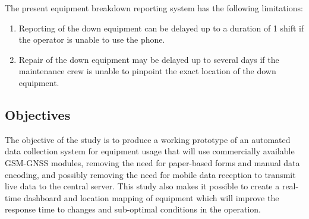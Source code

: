 \documentclass{article}
\begin{document}
The present equipment breakdown reporting system has the following limitations:

\begin{enumerate}
    \item Reporting of the down equipment can be delayed up to a duration of 1 shift if the operator is unable to use the phone.
    \item Repair of the down equipment may be delayed up to several days if the maintenance crew is unable to pinpoint the exact location of the down equipment.
\end{enumerate}


\subsection{Objectives}

The objective of the study is to produce a working prototype of an automated data collection system for equipment usage that will use commercially available GSM-GNSS modules, removing the need for paper-based forms and manual data encoding, and possibly removing the need for mobile data reception to transmit live data to the central server.
This study also makes it possible to create a real-time dashboard and location mapping of equipment which will improve the response time to changes and sub-optimal conditions in the operation.

\printbibliography
\end{document}
